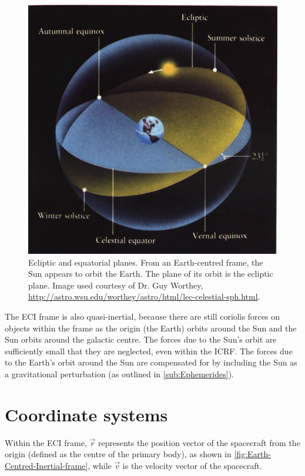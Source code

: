 \begin{figure} [htp]
\begin{center}
\includegraphics [scale=0.75]{Images/cel-sphere-2.png}
\end{center}
\caption{Ecliptic and equatorial planes. From an Earth-centred frame, the Sun appears to orbit the Earth. The plane of its orbit is the ecliptic plane. Image used courtesy of Dr. Guy Worthey, \url{http://astro.wsu.edu/worthey/astro/html/lec-celestial-sph.html}.}
\label{fig:Ecliptic-plane}
\end{figure}

The ECI frame is also quasi-inertial, because there are still coriolis forces on objects within the frame as the origin (the Earth) orbits around the Sun and the Sun orbits around the galactic centre. The forces due to the Sun's orbit are sufficiently small that they are neglected, even within the ICRF. The forces due to the Earth's orbit around the Sun are compensated for by including the Sun as a gravitational perturbation (as outlined in \autoref{sub:Ephemerides}).

\section{Coordinate systems} \label{sec:Coordinate-System}

Within the ECI frame, $\vec{r}$ represents the position vector of the spacecraft from the origin (defined as the centre of the primary body), as shown in \autoref{fig:Earth-Centred-Inertial-frame}, while $\vec{v}$ is the velocity vector of the spacecraft.


